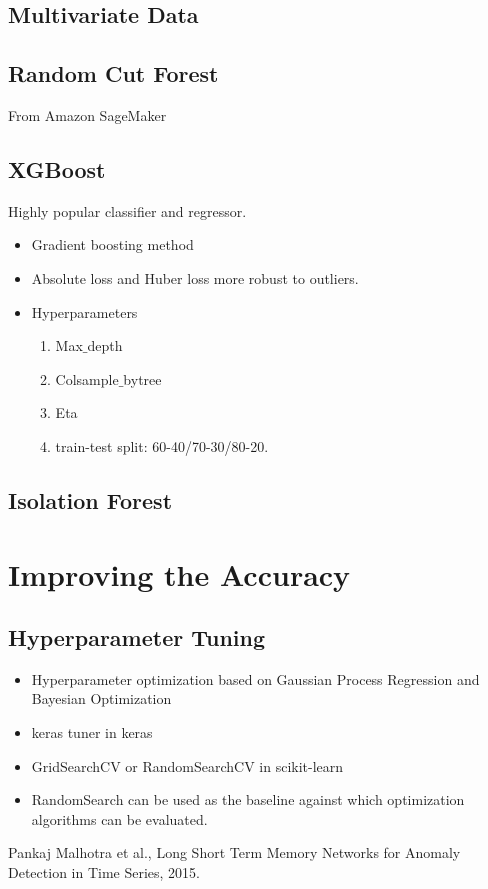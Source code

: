 \documentclass[a4paper, 12pt]{report}
\begin{document}
\section{Multivariate Data}

\section{Random Cut Forest}
From Amazon SageMaker

\section{XGBoost}
Highly popular classifier and regressor. 
\begin{itemize}
\item Gradient boosting method
\item Absolute loss and Huber loss more robust to outliers.
\item Hyperparameters
\begin{enumerate}
\item Max$\_$depth
\item Colsample$\_$bytree
\item Eta
\item train-test split: 60-40/70-30/80-20.
\end{enumerate}
\end{itemize}

\section{Isolation Forest}


\chapter{Improving the Accuracy}
\section{Hyperparameter Tuning}
\begin{itemize}
\item Hyperparameter optimization based on Gaussian Process Regression and Bayesian Optimization
\item keras tuner in keras
\item GridSearchCV or RandomSearchCV in scikit-learn
\item RandomSearch can be used as the baseline against which optimization algorithms can be evaluated.
\end{itemize}

\begin{thebibliography}{999}
	Pankaj Malhotra et al.,
	Long Short Term Memory Networks for Anomaly Detection in Time Series,
	2015.
\end{thebibliography}
\end{document}
